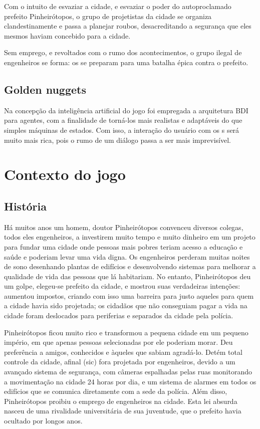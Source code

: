 Com o intuito de esvaziar a cidade, e esvaziar o poder do autoproclamado prefeito Pinheirótopos, o grupo de projetistas da cidade se organiza clandestinamente e passa a planejar roubos, desacreditando a segurança que eles mesmos haviam concebido para a cidade.


Sem emprego, e revoltados com o rumo dos acontecimentos, o grupo ilegal de engenheiros se forma: os \nomeGrupo{} se preparam para uma batalha épica contra o prefeito.

\subsection{Golden nuggets}
Na concepção da inteligência artificial do jogo foi empregada a arquitetura BDI para agentes, com a finalidade de torná-los mais realistas e adaptáveis do que simples máquinas de estados. Com isso, a interação do usuário com os \npc{}s será muito mais rica, pois o rumo de um diálogo passa a ser mais imprevisível.

\section{Contexto do jogo}
\subsection{História}

Há muitos anos um homem, doutor Pinheirótopos convenceu diversos colegas, todos eles engenheiros, a investirem muito tempo e muito dinheiro em um projeto para fundar uma cidade onde pessoas mais pobres teriam acesso a educação e saúde e poderiam levar uma vida digna. Os engenheiros perderam muitas noites de sono desenhando plantas de edifícios e desenvolvendo sistemas para melhorar a qualidade de vida das pessoas que lá habitariam.
No entanto, Pinheirótopos deu um golpe, elegeu-se prefeito da cidade, e mostrou suas verdadeiras intenções: aumentou impostos, criando com isso uma barreira para justo aqueles para quem a cidade havia sido projetada; os cidadãos que não conseguiam pagar a vida na cidade foram deslocados para periferias e separados da cidade pela polícia.

Pinheirótopos ficou muito rico e transformou a pequena cidade em um pequeno império, em que apenas pessoas selecionadas  por ele poderiam morar. Deu preferência a amigos, conhecidos e àqueles que sabiam agradá-lo. Detém total controle da cidade, afinal (sic) fora projetada por engenheiros, devido a um avançado sistema de segurança, com câmeras espalhadas pelas ruas monitorando a movimentação na cidade 24 horas por dia, e um sistema de alarmes em todos os edifícios que se comunica diretamente com a sede da polícia. Além disso, Pinheirótopos proibiu o emprego de engenheiros na cidade. Esta lei absurda nasceu de uma rivalidade universitária de sua juventude, que o prefeito havia ocultado por longos anos.

